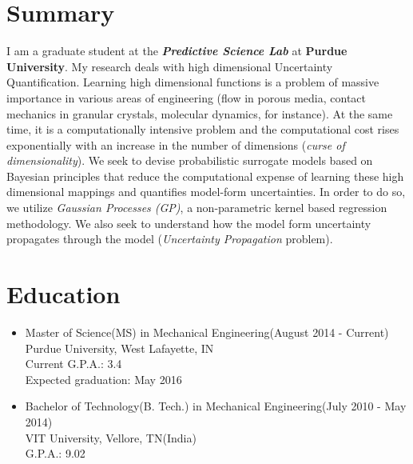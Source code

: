 \documentclass[11pt, line, margin]{res}
\begin{document}
\address{Apt.\#2, 225 South River Road, West Lafayette, IN-47906, USA}

\begin{resume}

\section{\Large Summary}
I am a graduate student at the \textit{\textbf{Predictive Science Lab}} at \textbf{Purdue University}. My research deals with high dimensional Uncertainty Quantification. Learning high dimensional functions is a problem of massive importance in various areas of engineering (flow in porous media, contact mechanics in granular crystals, molecular dynamics, for instance). At the same time, it is a computationally intensive problem and the computational cost rises exponentially with an increase in the number of dimensions (\textit{curse of dimensionality}). We seek to devise probabilistic surrogate models based on Bayesian principles that reduce the computational expense of learning these high dimensional mappings and quantifies model-form uncertainties. In order to do so, we utilize \textit{Gaussian Processes (GP)}, a non-parametric kernel based regression methodology. We also seek to understand how the model form uncertainty propagates through the model (\textit{Uncertainty Propagation} problem).

\section{\Large Education}
\begin{itemize}
\item Master of Science(MS) in Mechanical Engineering(August 2014 - Current) \\ Purdue University, West Lafayette, IN \\ Current G.P.A.: 3.4 \\ Expected graduation: May 2016
\item Bachelor of Technology(B. Tech.) in Mechanical Engineering(July 2010 - May 2014) \\ VIT University, Vellore, TN(India) \\ G.P.A.: 9.02
\end{itemize}


\end{resume}
\end{document}
